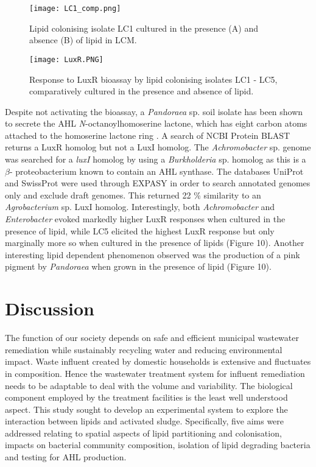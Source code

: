 \documentclass[twoside]{article}
\begin{document}
\begin{figure}
\texttt{[image: LC1\_comp.png]}
\caption{Lipid colonising isolate LC1 cultured in the presence (A) and absence (B) of lipid in LCM.}
\end{figure}

\begin{figure}
\texttt{[image: LuxR.PNG]}
\caption{Response to LuxR bioassay by lipid colonising isolates LC1 - LC5, comparatively cultured in the presence and absence of lipid.}
\end{figure}

Despite not activating the bioassay, a \emph{Pandoraea} sp. soil isolate has been shown to secrete the AHL \emph{N}-octanoylhomoserine lactone, which has eight carbon atoms attached to the homoserine lactone ring \cite{han2013pandoraea}. A search of NCBI Protein BLAST returns a LuxR homolog but not a LuxI homolog. The \emph{Achromobacter} sp. genome was searched for a \emph{luxI} homolog by using a \emph{Burkholderia} sp. homolog as  this is a \emph{$\beta$}- proteobacterium known to contain an AHL synthase. The databases UniProt and SwissProt were used through EXPASY in order to search annotated genomes only and exclude draft genomes. This returned  22 \% similarity to an \emph{Agrobacterium} sp. LuxI homolog.
Interestingly, both \emph{Achromobacter} and \emph{Enterobacter} evoked markedly higher LuxR responses when cultured in the presence of lipid, while LC5 elicited the highest LuxR response but only marginally more so when cultured in the presence of lipids (Figure 10). Another interesting lipid dependent phenomenon observed was the production of a pink pigment by \emph{Pandoraea} when grown in the presence of lipid (Figure 10).
\FloatBarrier    
 

\newpage
\section{Discussion}
\thispagestyle{plain}
The function of our society depends on safe and efficient municipal wastewater remediation while sustainably recycling water and reducing environmental impact. Waste influent created by domestic households is extensive and fluctuates in composition. Hence the wastewater treatment system for influent remediation needs to be adaptable to deal with the volume and variability. The biological component employed by the treatment facilities is the least well understood aspect. This study sought to develop an experimental system to explore the interaction between lipids and activated sludge. Specifically, five aims were addressed relating to spatial aspects of lipid partitioning and colonisation, impacts on bacterial community composition, isolation of lipid degrading bacteria and testing for AHL production.
\end{document}
